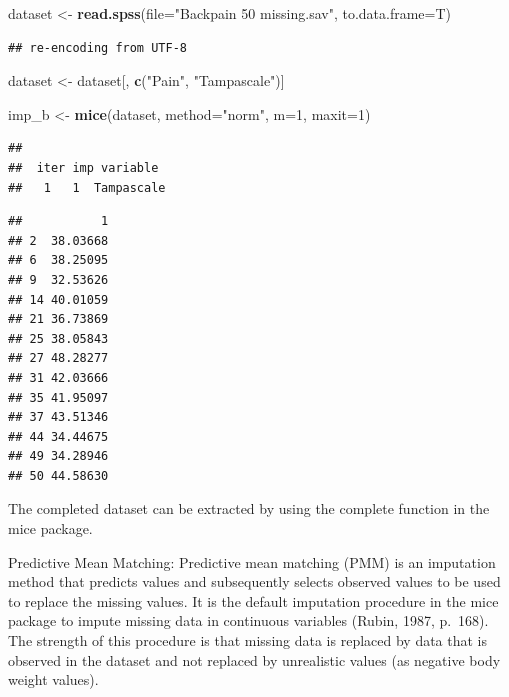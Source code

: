\documentclass[]{book}
\newenvironment{Shaded}{\begin{snugshade}}{\end{snugshade}}
\newcommand{\KeywordTok}[1]{\textcolor[rgb]{0.13,0.29,0.53}{\textbf{#1}}}
\newcommand{\DataTypeTok}[1]{\textcolor[rgb]{0.13,0.29,0.53}{#1}}
\newcommand{\DecValTok}[1]{\textcolor[rgb]{0.00,0.00,0.81}{#1}}
\newcommand{\StringTok}[1]{\textcolor[rgb]{0.31,0.60,0.02}{#1}}
\newcommand{\CommentTok}[1]{\textcolor[rgb]{0.56,0.35,0.01}{\textit{#1}}}
\newcommand{\OperatorTok}[1]{\textcolor[rgb]{0.81,0.36,0.00}{\textbf{#1}}}
\newcommand{\NormalTok}[1]{#1}
\theoremstyle{definition}
\theoremstyle{definition}
\theoremstyle{definition}
\theoremstyle{remark}
\begin{document}
\begin{Shaded}
\begin{Highlighting}[]
\NormalTok{dataset <-}\StringTok{ }\KeywordTok{read.spss}\NormalTok{(}\DataTypeTok{file=}\StringTok{"Backpain 50 missing.sav"}\NormalTok{, }\DataTypeTok{to.data.frame=}\NormalTok{T)}
\end{Highlighting}
\end{Shaded}

\begin{verbatim}
## re-encoding from UTF-8
\end{verbatim}

\begin{Shaded}
\begin{Highlighting}[]
\NormalTok{dataset <-}\StringTok{ }\NormalTok{dataset[, }\KeywordTok{c}\NormalTok{(}\StringTok{"Pain"}\NormalTok{, }\StringTok{"Tampascale"}\NormalTok{)]}

\NormalTok{imp_b <-}\StringTok{ }\KeywordTok{mice}\NormalTok{(dataset, }\DataTypeTok{method=}\StringTok{"norm"}\NormalTok{, }\DataTypeTok{m=}\DecValTok{1}\NormalTok{, }\DataTypeTok{maxit=}\DecValTok{1}\NormalTok{)}
\end{Highlighting}
\end{Shaded}

\begin{verbatim}
## 
##  iter imp variable
##   1   1  Tampascale
\end{verbatim}

\begin{Shaded}
\end{Shaded}

\begin{verbatim}
##           1
## 2  38.03668
## 6  38.25095
## 9  32.53626
## 14 40.01059
## 21 36.73869
## 25 38.05843
## 27 48.28277
## 31 42.03666
## 35 41.95097
## 37 43.51346
## 44 34.44675
## 49 34.28946
## 50 44.58630
\end{verbatim}

The completed dataset can be extracted by using the complete function in
the mice package.

Predictive Mean Matching: Predictive mean matching (PMM) is an
imputation method that predicts values and subsequently selects observed
values to be used to replace the missing values. It is the default
imputation procedure in the mice package to impute missing data in
continuous variables (Rubin, 1987, p.~168). The strength of this
procedure is that missing data is replaced by data that is observed in
the dataset and not replaced by unrealistic values (as negative body
weight values).
\end{document}
